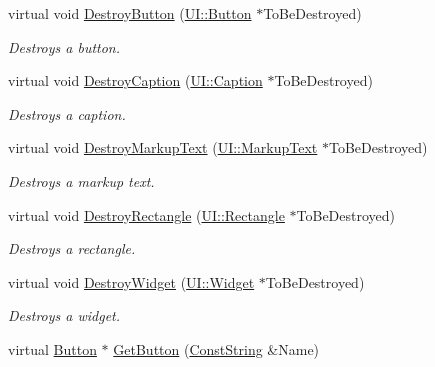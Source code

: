 \begin{DoxyCompactItemize}
virtual void \hyperlink{classMezzanine_1_1UI_1_1RenderableContainerWidget_a190db65e0ffef0cd0239799038b8e082}{DestroyButton} (\hyperlink{classMezzanine_1_1UI_1_1Button}{UI::Button} $\ast$ToBeDestroyed)
\begin{DoxyCompactList}\small\item\em Destroys a button. \item\end{DoxyCompactList}\item 
virtual void \hyperlink{classMezzanine_1_1UI_1_1RenderableContainerWidget_afa2fcd8083709cebd768ab64e9fa6a5c}{DestroyCaption} (\hyperlink{classMezzanine_1_1UI_1_1Caption}{UI::Caption} $\ast$ToBeDestroyed)
\begin{DoxyCompactList}\small\item\em Destroys a caption. \item\end{DoxyCompactList}\item 
virtual void \hyperlink{classMezzanine_1_1UI_1_1RenderableContainerWidget_adc1447e4d57471119df261ef1689f085}{DestroyMarkupText} (\hyperlink{classMezzanine_1_1UI_1_1MarkupText}{UI::MarkupText} $\ast$ToBeDestroyed)
\begin{DoxyCompactList}\small\item\em Destroys a markup text. \item\end{DoxyCompactList}\item 
virtual void \hyperlink{classMezzanine_1_1UI_1_1RenderableContainerWidget_aea0493e6e52d3fbb0b195f9e5ecaab00}{DestroyRectangle} (\hyperlink{classMezzanine_1_1UI_1_1Rectangle}{UI::Rectangle} $\ast$ToBeDestroyed)
\begin{DoxyCompactList}\small\item\em Destroys a rectangle. \item\end{DoxyCompactList}\item 
virtual void \hyperlink{classMezzanine_1_1UI_1_1RenderableContainerWidget_a8b3ae9758380265ee2ca54edef9791ac}{DestroyWidget} (\hyperlink{classMezzanine_1_1UI_1_1Widget}{UI::Widget} $\ast$ToBeDestroyed)
\begin{DoxyCompactList}\small\item\em Destroys a widget. \item\end{DoxyCompactList}\item 
virtual \hyperlink{classMezzanine_1_1UI_1_1Button}{Button} $\ast$ \hyperlink{classMezzanine_1_1UI_1_1RenderableContainerWidget_a2569f8c7641efa475aba9ff8efad1ce2}{GetButton} (\hyperlink{namespaceMezzanine_a63cd699ac54b73953f35ec9cfc05e506}{ConstString} \&Name)

\end{DoxyCompactItemize}
